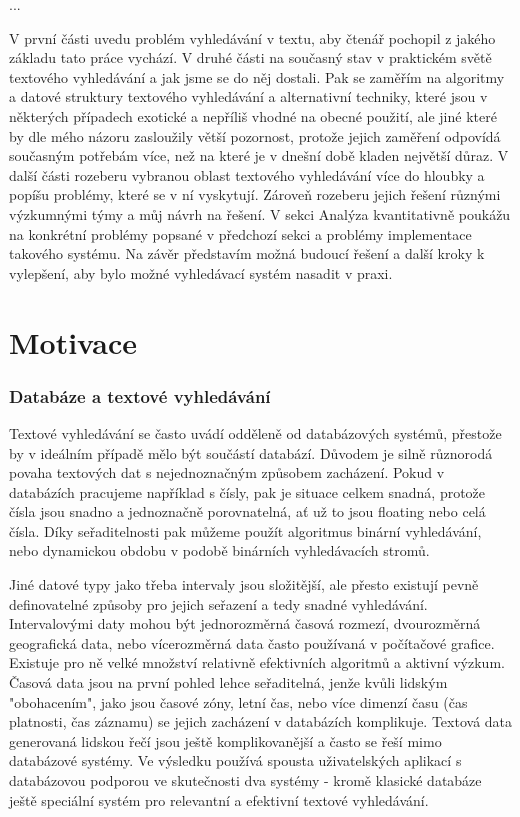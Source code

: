 \documentclass[12pt,letterpaper,oneside,openright]{book}
\begin{document}
...

V první části uvedu problém vyhledávání v textu, aby čtenář pochopil z jakého
základu tato práce vychází. V druhé části na současný stav v praktickém světě
textového vyhledávání a jak jsme se do něj dostali. Pak se zaměřím na algoritmy
a datové struktury textového vyhledávání a alternativní techniky, které jsou v
některých případech exotické a nepříliš vhodné na obecné použití, ale jiné
které by dle mého názoru zasloužily větší pozornost, protože jejich zaměření
odpovídá současným potřebám více, než na které je v dnešní době kladen největší
důraz. V další části rozeberu vybranou oblast textového vyhledávání více do
hloubky a popíšu problémy, které se v ní vyskytují. Zároveň rozeberu jejich
řešení různými výzkumnými týmy a můj návrh na řešení. V sekci Analýza
kvantitativně poukážu na konkrétní problémy popsané v předchozí sekci a
problémy implementace takového systému. Na závěr představím možná budoucí
řešení a další kroky k vylepšení, aby bylo možné vyhledávací systém nasadit v
praxi.

\chapter{Motivace}

\subsection{Databáze a textové vyhledávání}
Textové vyhledávání se často uvádí odděleně od databázových systémů, přestože
by v ideálním případě mělo být součástí databází. Důvodem je silně různorodá
povaha textových dat s nejednoznačným způsobem zacházení. Pokud v databázích
pracujeme například s čísly, pak je situace celkem snadná, protože čísla jsou
snadno a jednoznačně porovnatelná, ať už to jsou floating nebo celá čísla. Díky
seřaditelnosti pak můžeme použít algoritmus binární vyhledávání, nebo
dynamickou obdobu v podobě binárních vyhledávacích stromů.

Jiné datové typy jako třeba intervaly jsou složitější, ale přesto existují
pevně definovatelné způsoby pro jejich seřazení a tedy snadné vyhledávání.
Intervalovými daty mohou být jednorozměrná časová rozmezí, dvourozměrná
geografická data, nebo vícerozměrná data často používaná v počítačové grafice.
Existuje pro ně velké množství relativně efektivních algoritmů a aktivní
výzkum. Časová data jsou na první pohled lehce seřaditelná, jenže kvůli lidským
"obohacením", jako jsou časové zóny, letní čas, nebo více dimenzí času (čas
platnosti, čas záznamu) se jejich zacházení v databázích komplikuje. Textová
data generovaná lidskou řečí jsou ještě komplikovanější a často se řeší mimo
databázové systémy. Ve výsledku používá spousta uživatelských aplikací s
databázovou podporou ve skutečnosti dva systémy - kromě klasické databáze ještě
speciální systém pro relevantní a efektivní textové vyhledávání.
\end{document}
